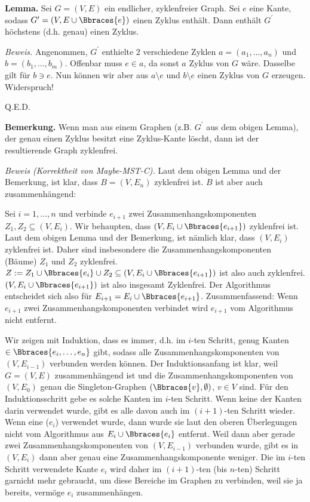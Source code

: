 \begin{solution}
\begin{enumerate}[label = (\Alph*)]
    \textbf{Lemma.}
    Sei $G = (V, E)$ ein endlicher, zyklenfreier Graph.
    Sei $e$ eine Kante, sodass $G^\prime = (V, E \cup \Bbraces{e})$ einen Zyklus enthält.
    Dann enthält $G^\prime$ höchstens (d.h. genau) einen Zyklus.

    \textit{Beweis.}
    Angenommen, $G^\prime$ enthielte $2$ verschiedene Zyklen $a = (a_1, \dots, a_n)$ und $b = (b_1, \dots, b_m)$.
    Offenbar muss $e \in a$, da sonst $a$ Zyklus von $G$ wäre.
    Dasselbe gilt für $b \ni e$.
    Nun können wir aber aus $a \setminus e$ und $b \setminus e$ einen Zyklus von $G$ erzeugen.
    Widerspruch!

    Q.E.D.

    \textbf{Bemerkung.}
    Wenn man aus einem Graphen (z.B. $G^\prime$ aus dem obigen Lemma), der genau einen Zyklus besitzt eine Zyklus-Kante löscht, dann ist der resultierende Graph zyklenfrei.

    \textit{Beweis (Korrektheit von Maybe-MST-C).}
    Laut dem obigen Lemma und der Bemerkung, ist klar, dass $B = (V, E_n)$ zyklenfrei ist.
    $B$ ist aber auch zusammenhängend:

    Sei $i = 1, \dots, n$ und verbinde $e_{i+1}$ zwei Zusammenhangskomponenten $Z_1, Z_2 \subseteq (V, E_i)$.
    Wir behaupten, dass $(V, E_i \cup \Bbraces{e_{i+1}})$ zyklenfrei ist.
    Laut dem obigen Lemma und der Bemerkung, ist nämlich klar, dass $(V, E_i)$ zyklenfrei ist.
    Daher sind insbesondere die Zusammenhangskomponenten (Bäume) $Z_1$ und $Z_2$ zyklenfrei.
    $Z := Z_1 \cup \Bbraces{e_i} \cup Z_2 \subseteq (V, E_i \cup \Bbraces{e_{i+1}})$ ist also auch zyklenfrei.
    $(V, E_i \cup \Bbraces{e_{i+1}})$ ist also insgesamt Zyklenfrei.
    Der Algorithmus entscheidet sich also für $E_{i+1} = E_i \cup \Bbraces{e_{i+1}}$.
    Zusammenfassend:
    Wenn $e_{i+1}$ zwei Zusammenhangskomponenten verbindet wird $e_{i+1}$ vom Algorithmus nicht entfernt.

    Wir zeigen mit Induktion, dass es immer, d.h. im $i$-ten Schritt, genug Kanten $\in \Bbraces{e_i, \dots, e_n}$ gibt, sodass alle Zusammenhangskomponenten von $(V, E_{i-1})$ verbunden werden können.
    Der Induktionsanfang ist klar, weil $G = (V, E)$ zusammenhängend ist und die Zusammenhangskomponenten von $(V, E_0)$ genau die Singleton-Graphen $(\Bbraces{v}, \emptyset)$, $v \in V$ sind.
    Für den Induktionsschritt gebe es solche Kanten im $i$-ten Schritt.
    Wenn keine der Kanten darin verwendet wurde, gibt es alle davon auch im $(i+1)$-ten Schritt wieder.
    Wenn eine ($e_i$) verwendet wurde, dann wurde sie laut den oberen Überlegungen nicht vom Algorithmus aus $E_i \cup \Bbraces{e_i}$ entfernt.
    Weil dann aber gerade zwei Zusammenhangskomponenten von $(V, E_{i-1})$ verbunden wurde, gibt es in $(V, E_i)$ dann aber genau eine Zusammenhangskomponente weniger.
    Die im $i$-ten Schritt verwendete Kante $e_i$ wird daher im $(i+1)$-ten (bis $n$-ten) Schritt garnicht mehr gebraucht, um diese Bereiche im Graphen zu verbinden, weil sie ja bereits, vermöge $e_i$ zusammenhängen.


\end{enumerate}
\end{solution}
